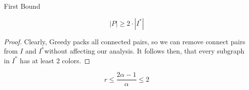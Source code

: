 \begin{frame}{First Bound}
	
\begin{lemma}
$$ |P| \geq 2 \cdot |I^*| $$
\end{lemma}

\begin{proof}
Clearly, Greedy packs all connected pairs, so we can remove connect pairs 
from $I$ and $I^*$without affecting our analysis. 
It follows then, that every subgraph in $I^*$ has at least 2 colors. 
\end{proof}

\begin{corollary}
$$r \leq \frac{2 \alpha - 1}{\alpha} \leq 2$$
\end{corollary}


\end{frame}

